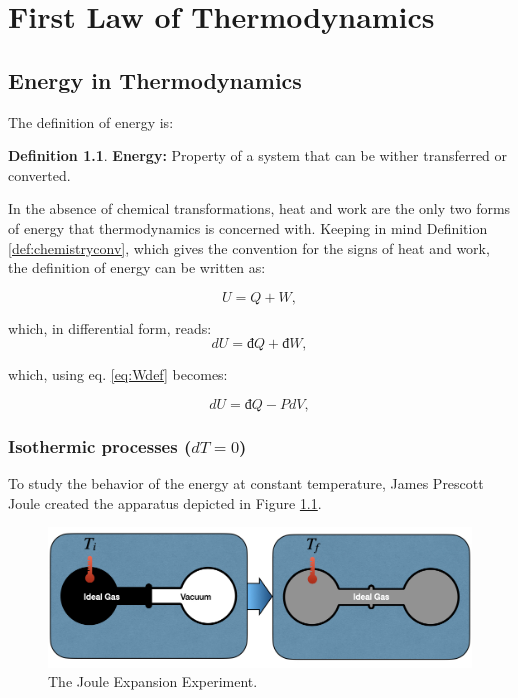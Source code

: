 \documentclass[
]{book}
\theoremstyle{definition}
\newtheorem{definition}{Definition}[chapter]
\theoremstyle{definition}
\theoremstyle{definition}
\theoremstyle{remark}
\begin{document}
\hypertarget{FirstLaw}{%
\chapter{First Law of Thermodynamics}\label{FirstLaw}}

\hypertarget{energy-in-thermodynamics}{%
\section{Energy in Thermodynamics}\label{energy-in-thermodynamics}}

The definition of energy is:

\begin{definition}
\protect\hypertarget{def:energy}{}{\label{def:energy} }\textbf{Energy:} Property of a system that can be wither transferred or converted.
\end{definition}

In the absence of chemical transformations, heat and work are the only two forms of energy that thermodynamics is concerned with. Keeping in mind Definition \ref{def:chemistryconv}, which gives the convention for the signs of heat and work, the definition of energy can be written as:

\begin{equation}
  U = Q + W,
  \label{eq:U}
\end{equation}

which, in differential form, reads:
\begin{equation}
  dU = đ Q + đ W,
  \label{eq:dU}
\end{equation}

which, using eq. \eqref{eq:Wdef} becomes:

\begin{equation}
  dU = đ Q - PdV,
  \label{eq:dUpdv}
\end{equation}

\hypertarget{isothermic-processes-dt0}{%
\subsection{\texorpdfstring{Isothermic processes (\(dT=0\))}{Isothermic processes (dT=0)}}\label{isothermic-processes-dt0}}

To study the behavior of the energy at constant temperature, James Prescott Joule created the apparatus depicted in Figure \ref{fig:FigJexp}.

\begin{figure}

{\centering \includegraphics[width=0.8\linewidth]{./img/OEP_Figures.006} 

}

\caption{The Joule Expansion Experiment.}\label{fig:FigJexp}
\end{figure}
\end{document}
